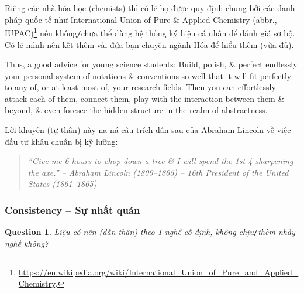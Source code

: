 \documentclass[12pt]{article}
\newtheorem{question}{Question}
\begin{document}
Riêng các nhà hóa học (chemists) thì có lẽ họ được quy định chung bởi các danh pháp quốc tế như International Union of Pure \& Applied Chemistry (abbr., IUPAC)\footnote{\url{https://en.wikipedia.org/wiki/International_Union_of_Pure_and_Applied_Chemistry}.} nên không{\tt/}chưa thể dùng hệ thống ký hiệu cá nhân để đánh giá sơ bộ. Có lẽ mình nên kết thêm vài đứa bạn chuyên ngành Hóa để hiểu thêm (vừa đủ).

Thus, a good advice for young science students: Build, polish, \& perfect endlessly your personal system of notations \& conventions so well that it will fit perfectly to any of, or at least most of, your research fields. Then you can effortlessly attack each of them, connect them, play with the interaction between them \& beyond, \& even foresee the hidden structure in the realm of abstractness.

Lời khuyên (tự thân) này na ná câu trích dẫn sau của Abraham Lincoln về việc đầu tư khâu chuẩn bị kỹ lưỡng:
\begin{quotation}\it
	``Give me 6 hours to chop down a tree \& I will spend the 1st 4 sharpening the axe.'' -- {\sc Abraham Lincoln} (1809--1865) -- 16th President of the United States (1861--1865)
\end{quotation}

\subsubsection{Consistency -- Sự nhất quán}

\begin{question}
	Liệu có nên (dấn thân) theo 1 nghề cố định, không chịu{\tt/}thèm nhảy nghề không? 
\end{question}
\end{document}
